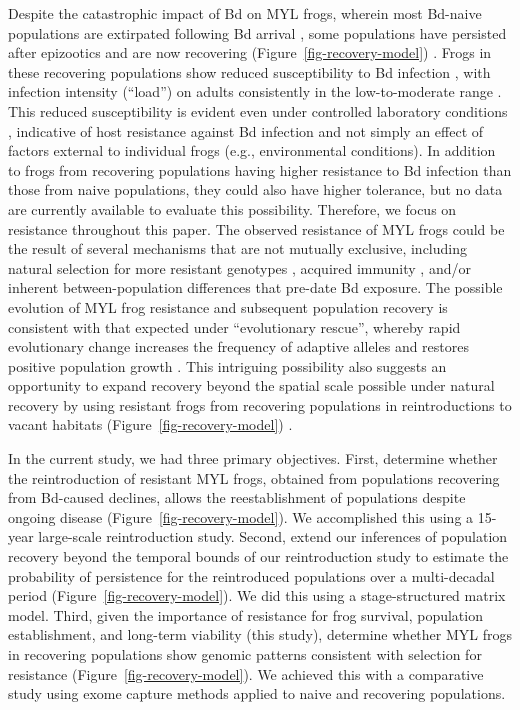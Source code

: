 \documentclass[9pt,twocolumn,twoside,lineno]{pnas-new}
\begin{document}
Despite the catastrophic impact of Bd on MYL frogs, wherein most
Bd-naive populations are extirpated following Bd arrival
\citep{vredenburg2010}, some populations have persisted after epizootics
\citep[during which Bd infection intensity on frogs is very
high,][]{briggs2010} and are now recovering
(Figure~\ref{fig-recovery-model}) \citep{knapp2016}. Frogs in these
recovering populations show reduced susceptibility to Bd infection
\citep{knapp2016}, with infection intensity (``load'') on adults
consistently in the low-to-moderate range
\citep{briggs2010, knapp2011, joseph2018}. This reduced susceptibility
is evident even under controlled laboratory conditions
\citep{knapp2016}, indicative of host resistance against Bd infection
and not simply an effect of factors external to individual frogs (e.g.,
environmental conditions). In addition to frogs from recovering
populations having higher resistance to Bd infection than those from
naive populations, they could also have higher tolerance, but no data
are currently available to evaluate this possibility. Therefore, we
focus on resistance throughout this paper. The observed resistance of
MYL frogs could be the result of several mechanisms that are not
mutually exclusive, including natural selection for more resistant
genotypes \citep{savage2016, grogan2018b}, acquired immunity
\citep{grogan2018a}, and/or inherent between-population differences that
pre-date Bd exposure. The possible evolution of MYL frog resistance and
subsequent population recovery is consistent with that expected under
``evolutionary rescue'', whereby rapid evolutionary change increases the
frequency of adaptive alleles and restores positive population growth
\citep{carlson2014, searle2020}. This intriguing possibility also
suggests an opportunity to expand recovery beyond the spatial scale
possible under natural recovery by using resistant frogs from recovering
populations in reintroductions to vacant habitats
(Figure~\ref{fig-recovery-model}) \citep{joseph2018, mendelson2019}.

In the current study, we had three primary objectives. First, determine
whether the reintroduction of resistant MYL frogs, obtained from
populations recovering from Bd-caused declines, allows the
reestablishment of populations despite ongoing disease
(Figure~\ref{fig-recovery-model}). We accomplished this using a 15-year
large-scale reintroduction study. Second, extend our inferences of
population recovery beyond the temporal bounds of our reintroduction
study to estimate the probability of persistence for the reintroduced
populations over a multi-decadal period
(Figure~\ref{fig-recovery-model}). We did this using a stage-structured
matrix model. Third, given the importance of resistance for frog
survival, population establishment, and long-term viability (this
study), determine whether MYL frogs in recovering populations show
genomic patterns consistent with selection for resistance
(Figure~\ref{fig-recovery-model}). We achieved this with a comparative
study using exome capture methods applied to naive and recovering
populations.
\end{document}
